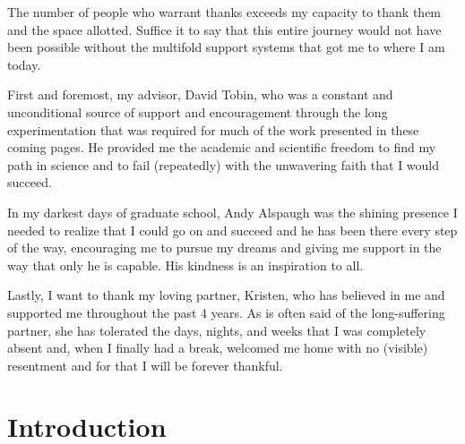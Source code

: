 \documentclass[PhD]{dukethesis2006}
\begin{document}
\begin{doublespace}

\acknowledgements

The number of people who warrant thanks exceeds my capacity to thank them and the space allotted. Suffice it to say that this entire journey would not have been possible without the multifold support systems that got me to where I am today.

First and foremost, my advisor, David Tobin, who was a constant and unconditional source of support and encouragement through the long experimentation that was required for much of the work presented in these coming pages. He provided me the academic and scientific freedom to find my path in science and to fail (repeatedly) with the unwavering faith that I would succeed.

In my darkest days of graduate school, Andy Alspaugh was the shining presence I needed to realize that I could go on and succeed and he has been there every step of the way, encouraging me to pursue my dreams and giving me support in the way that only he is capable. His kindness is an inspiration to all.

Lastly, I want to thank my loving partner, Kristen, who has believed in me and supported me throughout the past 4 years. As is often said of the long-suffering partner, she has tolerated the days, nights, and weeks that I was completely absent and, when I finally had a break, welcomed me home with no (visible) resentment and for that I will be forever thankful.


\end{doublespace}

\tableofcontents


\chapter{Introduction}

\end{document}
